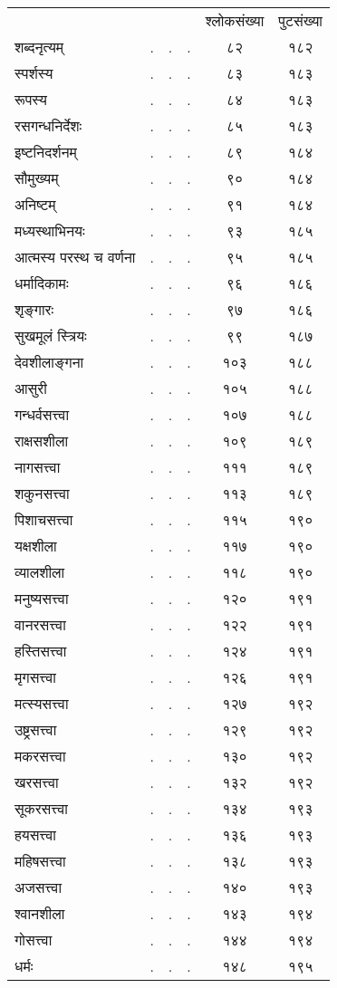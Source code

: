 \documentclass[11pt, openany]{book}
\begin{document}
\newpage

\begin{center}
\begin{tabular}{m{10em} m{2em} m{2em} m{2em} c c}
& & & & श्लोकसंख्या & पुटसंख्या\\
शब्दनृत्यम्& .& .& .&८२& १८२\\
स्पर्शस्य& .& .& .&८३& १८३\\
रूपस्य& .& .& .&८४& १८३\\
रसगन्धनिर्देशः& .& .& .&८५ &१८३\\
इष्टनिदर्शनम्& .& .& .&८९ &१८४\\
सौमुख्यम्& .& .& .&९०& १८४\\
अनिष्टम्& .& .& .&९१ &१८४\\
मध्यस्थाभिनयः& .& .& .&९३ &१८५\\
आत्मस्य परस्थ च वर्णना& .& .& .&९५ &१८५\\
धर्मादिकामः& .& .& .&९६ &१८६\\
शृङ्गारः& .& .& .&९७ &१८६\\
सुखमूलं स्त्रियः& .& .& .&९९ &१८७\\
देवशीलाङ्गना& .& .& .&१०३ &१८८\\
आसुरी& .& .& .&१०५ &१८८\\
गन्धर्वसत्त्वा& .& .& .&१०७ &१८८\\
राक्षसशीला& .& .& .&१०९ &१८९\\
नागसत्त्वा& .& .& .&१११ &१८९\\
शकुनसत्त्वा& .& .& .&११३ &१८९\\
पिशाचसत्त्वा& .& .& .&११५& १९०\\
यक्षशीला& .& .& .&११७ &१९०\\
व्यालशीला& .& .& .&११८ &१९०\\
मनुष्यसत्त्वा& .& .& .&१२० &१९१\\
वानरसत्त्वा& .& .& .&१२२ &१९१\\
हस्तिसत्त्वा& .& .& .&१२४ &१९१\\
मृगसत्त्वा& .& .& .&१२६& १९१\\
मत्स्यसत्त्वा& .& .& .&१२७ &१९२\\
उष्ट्रसत्त्वा& .& .& .&१२९ &१९२\\
मकरसत्त्वा& .& .& .&१३० &१९२\\
खरसत्त्वा& .& .& .&१३२ &१९२\\
सूकरसत्त्वा& .& .& .&१३४ &१९३\\
हयसत्त्वा& .& .& .&१३६ &१९३\\
महिषसत्त्वा& .& .& .&१३८ &१९३\\
अजसत्त्वा& .& .& .&१४०& १९३\\
श्वानशीला& .& .& .&१४३ &१९४\\
गोसत्त्वा& .& .& .&१४४& १९४\\
धर्मः& .& .& .&१४८ &१९५
\end{tabular}
\end{center}
\end{document}
